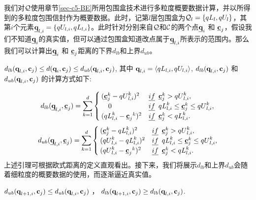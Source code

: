 我们对$\cal Q$使用章节\ref{sec-c5-BE}所用包围盒技术进行多粒度概要数据计算，并以所得到的多粒度包围信封作为概要数据。此时，记第$l$层包围盒为${\cal Q}_{l}= \{qL_{l},qU_{l}\}$，其第$i$个元素$\emph{{\textbf{q}}}_{l,i}=\{qU_{l,i}, qL_{l,i} \} $。此时针对分别来自$\cal Q$和$\cal C$的两个点$\emph{{\textbf{q}}}_{i}$ 和 $\emph{{\textbf{c}}}_{j}$，假设我们不知道$\emph{{\textbf{q}}}_{i}$的真实值，但可以通过包围盒知道改点属于$\emph{{\textbf{q}}}_{l,i}$所表示的范围内。那么我们可以计算出$\emph{{\textbf{q}}}_{i}$ 和 $\emph{{\textbf{c}}}_{j}$距离的下界$d_{lb}$和上界$d_{ub}$。
\begin{lemma}\label{lemma:SEDLUB}
	$d_{lb}(\textbf{q}_{l,i},\textbf{c}_{j})\le d(\textbf{q}_{i},\textbf{c}_{j})  \le d_{ub}(\textbf{q}_{l,i},\textbf{c}_{j})$, 其中 $\textbf{q}_{l,i}=\langle qL_{l,i}, qU_{l,i} \rangle$, $d_{lb}(\textbf{q}_{l,i},\textbf{c}_{j})$ 和 $d_{ub}(\textbf{q}_{l,i},\textbf{c}_{j})$ 的计算方式如下:
\allowdisplaybreaks[4]
\end{lemma}
\allowdisplaybreaks
 	\begin{equation}
 d_{lb}(\emph{{\textbf{q}}}_{l,i},\emph{{\textbf{c}}}_{j})=
 \sum_{k=1}^{d} \begin{cases}
 ({\emph{{\textbf{c}}}}_{j}^{k}- {qU}_{l,i}^{k})^2 & \emph{if} \,\,\,  {\emph{{\textbf{c}}}}_{j}^{k} > {qU}_{l,i}^{k},\\
 \quad 0 &   \emph{if} \,\,\,   {qL}_{l,i}^{k} \le \emph{{\textbf{c}}}_{j}^{k} \le {qU}_{l,i}^{k},\\
 ({qL}_{l,i}^{k} -{\emph{{\textbf{c}}}_{j}}^{k})^2 & \emph{if} \,\,\,    {\emph{{\textbf{c}}}}_{j}^{k} <{qL}_{l,i}^{k}.\\
 \end{cases}
 \end{equation}
 \allowdisplaybreaks[4]
 \allowdisplaybreaks
 \begin{equation}
 d_{ub}(\emph{{\textbf{q}}}_{l,i},\emph{{\textbf{c}}}_{j})=
 \sum_{k=1}^{d} \begin{cases}
 ({\emph{{\textbf{c}}}}_{j}^{k}- {qL}_{l,i}^{k})^2 & \emph{if} \,\,\,  {\emph{{\textbf{c}}}}_{j}^{k} > {qU}_{l,i}^{k},\\
 ({qU}_{l,i}^{k}- {qL}_{l,i}^{k})^2 &   \emph{if} \,\,\,   {qL}_{l,i}^{k} \le \emph{{\textbf{c}}}_{j}^{k} \le {qU}_{l,i}^{k},\\
 ({qU}_{l,i}^{k} -{\emph{{\textbf{c}}}_{j}}^{k})^2 & \emph{if} \,\,\,    {\emph{{\textbf{c}}}}_{j}^{k} < {qL}_{l,i}^{k}.\\
 \end{cases}
 \end{equation}
 上述引理可根据欧式距离的定义直观看出。接下来，我们将展示$d_{lb}$和上界$d_{ub}$会随着细粒度的概要数据的使用，而逐渐逼近真实值。
 \begin{lemma} \label{lemma:tighterPointBounds}
 	$d_{ub}(\textbf{q}_{l+1,i}, \textbf{c}_{j}) \le d_{ub}(\textbf{q}_{l,i}, \textbf{c}_{j})$ ， $d_{lb}(\textbf{q}_{l+1,i}, \textbf{c}_{j}) \ge d_{lb}(\textbf{q}_{l,i}, \textbf{c}_{j})$.
 \end{lemma}
